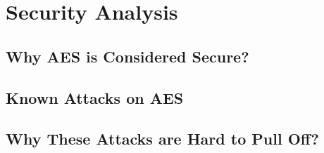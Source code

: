 \section{Security Analysis}

\subsection{Why AES is Considered Secure?}

\subsection{Known Attacks on AES}

\subsection{Why These Attacks are Hard to Pull Off?}